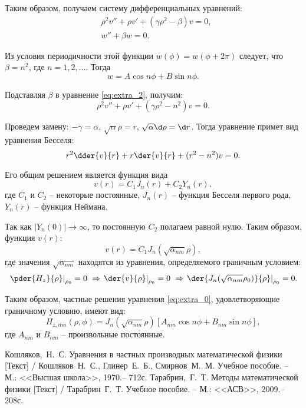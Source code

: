 Таким образом, получаем систему дифференциальных уравнений:
\begin{align}
    & \rho^2v'' + \rho v' + (\gamma\rho^2 - \beta)v = 0, \label{eq:extra_2} \\
    & w'' + \beta w = 0. \label{eq:extra_3}
\end{align}

Из условия периодичности этой функции \( w(\phi) = w(\phi + 2\pi) \) следует, что
\( \beta = n^2 \), где \( n = 1, 2, \ldots \). Тогда
\[
    w = A\cos n\phi + B\sin n\phi.
\]

Подставляя \( \beta \) в уравнение \eqref{eq:extra_2}, получим:
\[
    \rho^2v'' + \rho v' + (\gamma\rho^2 - n^2)v = 0.
\]

Проведем замену: \( -\gamma = \alpha \), \( \sqrt{\alpha}\rho = r \),
\( \sqrt{\alpha}\d\rho = \d r \). Тогда уравнение примет вид уравнения Бесселя:
\[
    r^2\dder{v}{r} + r\der{v}{r} + (r^2 - n^2)v = 0.
\]

Его общим решением является функция вида
\[
    v(r) = C_1 J_n(r) + C_2 Y_n(r),
\]
где \( C_1 \) и \( C_2 \) -- некоторые постоянные, \( J_n(r) \) -- функция Бесселя
первого рода, \( Y_n(r) \) -- функция Неймана.

Так как \( |Y_n(0)| \to \infty \), то постоянную \( C_2 \) полагаем равной нулю.
Таким образом, функция \( v(r) \):
\[
    v(r) = C_1 J_n(\sqrt{\alpha_{nm}}\rho),
\]
где значения \( \sqrt{\alpha_{nm}} \) находятся из уравнения, определяемого
граничным условием:
\[
    \left.\pder{H_z}{\rho}\right|_{\rho_0} = 0\ \Rightarrow
    \left.\der{v}{\rho}\right|_{\rho_0} = 0\ \Rightarrow
    \left.\der{J_n(\sqrt{\alpha_{nm}}\rho_0)}{\rho}\right|_{\rho_0} = 0.
\]

Таким образом, частные решения уравнения \eqref{eq:extra_0}, удовлетворяющие
граничному условию, имеют вид:
\[
    H_{z, nm}(\rho, \phi) = J_n(\sqrt{\alpha_{nm}}\rho)
    \left[A_{nm}\cos n\phi + B_{nm}\sin n\phi \right],
\]
где \( A_{nm} \) и \( B_{nm} \) -- произвольные постоянные.

\newpage
{}
\begin{thebibliography}{9}
    Кошляков,~Н.~С. Уравнения в частных производных
    математической физики [Текст] / Кошляков~Н.~С., Глинер~Е.~Б., Смирнов~М.~М.
    Учебное пособие. -- М.: <<Высшая школа>>, 1970.-- 712с.
    Тарабрин,~Г.~Т.  Методы математической физики [Текст] /
    Тарабрин~Г.~Т. Учебное пособие. -- М.: <<АСВ>>, 2009.-- 208с.
\end{thebibliography}
